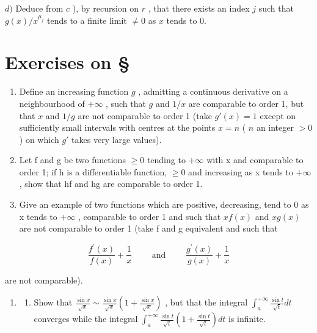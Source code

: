 \(d)\) Deduce from \(c\) ), by recursion on \(r\) , that there exists an index \(j\) such that \(g(x) / x^{\mu_j}\) tends to a finite limit \(\neq 0\) as \(x\) tends to 0.

\setcounter{exercisegroup}{2}
\section*{Exercises on \S{}}
{}

\begin{enumerate}
\def\labelenumi{\arabic{enumi})}
\item
  Define an increasing function \(g\) , admitting a continuous derivative on a neighbourhood of \(+\infty\) , such that \(g\) and \(1 / x\) are comparable to order 1, but that \(x\) and \(1 / g\) are not comparable to order 1 (take \(g'(x) = 1\) except on sufficiently small intervals with centres at the points \(x = n\) ( \(n\) an integer \(>0\) ) on which \(g'\) takes very large values).
\item
  Let f and g be two functions \(\geqslant0\) tending to \(+\infty\) with x and comparable to order 1; if h is a differentiable function, \(\geqslant0\) and increasing as x tends to \(+\infty\) , show that hf and hg are comparable to order 1.
\item
  Give an example of two functions which are positive, decreasing, tend to 0 as x tends to \(+\infty\) , comparable to order 1 and such that \(xf(x)\) and \(xg(x)\) are not comparable to order 1 (take f and g equivalent and such that
\end{enumerate}

\[
\frac {f ^ {\prime} (x)}{f (x)} + \frac {1}{x} \qquad \text { and } \qquad \frac {g ^ {\prime} (x)}{g (x)} + \frac {1}{x}
\]

are not comparable).

\begin{enumerate}
\def\labelenumi{\arabic{enumi})}
\setcounter{enumi}{3}
\tightlist
\item
  \begin{enumerate}
  \def\labelenumii{\alph{enumii})}
  \tightlist
  \item
    Show that \(\frac{\sin x}{\sqrt{x}} \sim \frac{\sin x}{\sqrt{x}} \left(1 + \frac{\sin x}{\sqrt{x}}\right)\) , but that the integral \(\int_{a}^{+\infty} \frac{\sin t}{\sqrt{t}} dt\) converges while the integral \(\int_{a}^{+\infty} \frac{\sin t}{\sqrt{t}} \left(1 + \frac{\sin t}{\sqrt{t}}\right) dt\) is infinite.
  \end{enumerate}
\end{enumerate}

